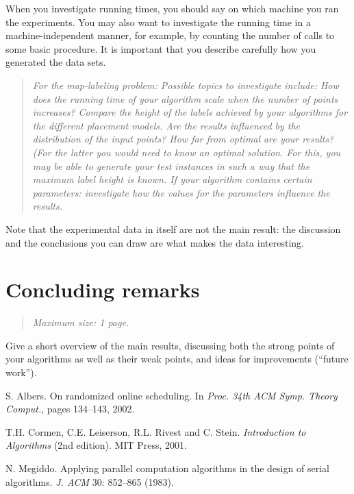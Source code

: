 \documentclass[11pt]{article}
\newcommand{\maxsize}[1]{\begin{quotation} {\sl \noindent Maximum size: #1.} \end{quotation}}
\newcommand{\ml}[1]{\begin{quotation} {\sl \noindent For the map-labeling problem: #1} \end{quotation}}
\begin{document}
							When you investigate running times, you should say on which machine you ran the experiments.
							You may also want to investigate the running time in a  machine-independent manner,
							for example, by counting the number of calls to some basic procedure.
							It is important that you describe carefully how you generated the data sets.
							\ml{Possible topics to investigate include: How does the running time of your algorithm
								scale when the number of points increases? Compare the height of the labels achieved by
									your algorithms for the different placement models. Are the results influenced by the
									distribution of the input points? How far from optimal are your results? (For the latter you
											would need to know an optimal solution. For this, you may be able to generate your test instances in
											such a way that the maximum label height is known. If your algorithm contains certain
											parameters: investigate how the values for the parameters influence the results.}

											Note that the experimental data in itself are not the main result: the discussion
											and the conclusions you can draw are what makes the data interesting.





											\section{Concluding remarks}
											\label{se:conclusions}
											\maxsize{1 page}
											Give a short overview of the main results, discussing both the strong
											points of your algorithms as well as their weak points, and ideas for improvements
											(``future work'').

											

									\begin{thebibliography}{}

									S. Albers.
									On randomized online scheduling.
									In \emph{Proc. 34th ACM Symp. Theory Comput.}, pages 134--143, 2002.

									T.H. Cormen, C.E. Leiserson, R.L. Rivest and C. Stein.
									\emph{Introduction to Algorithms} (2nd edition).
									MIT Press, 2001.

									N. Megiddo.
									Applying parallel computation algorithms in the design of serial algorithms.
									\emph{J. ACM} 30: 852--865 (1983).

									\end{thebibliography}
\end{document}
